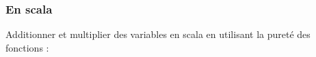 \documentclass[12pt]{article}
\begin{document}
\subsubsection*{En scala}
Additionner et multiplier des variables en scala en utilisant la pureté des fonctions :\par





\begin{figure}[H]	\begin{subfigure}		\texttt{[image: ./media/image7.png]}
	\end{subfigure}
~	\begin{subfigure}		\texttt{[image: ./media/image8.png]}
	\end{subfigure}
~
\end{figure}


\end{document}
